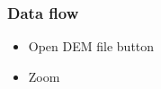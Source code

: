 \documentclass[11pt]{article}
\begin{document}
\subsubsection{Data flow}
\begin{itemize}
\item Open DEM file button
\par\noindent{}
\item Zoom
\par\noindent{}
\end{itemize}
\end{document}
